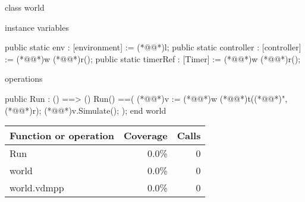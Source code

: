 \documentclass[a4paper]{article}
\begin{document}
\title{}
\author{}
\begin{vdm_al}
class world
  
instance variables  
  

public static  env : [environment] := (*@@*)l;
public static  controller : [controller] :=  (*@@*)w (*@@*)r();
public static  timerRef : [Timer] := (*@@*)w (*@@*)r();    

  
   
operations

public 
  Run : () ==> ()
  Run() ==(
    (*@@*)v := (*@@*)w (*@@*)t((*@@*)", (*@@*)r);
    (*@@*)v.Simulate();
    );
end world
\end{vdm_al}
\bigskip
\begin{longtable}{|l|r|r|}
\hline
Function or operation & Coverage & Calls \\
\hline
\hline
Run & 0.0\% & 0 \\
\hline
world & 0.0\% & 0 \\
\hline
\hline
world.vdmpp & 0.0\% & 0 \\
\hline
\end{longtable}
\end{document}
